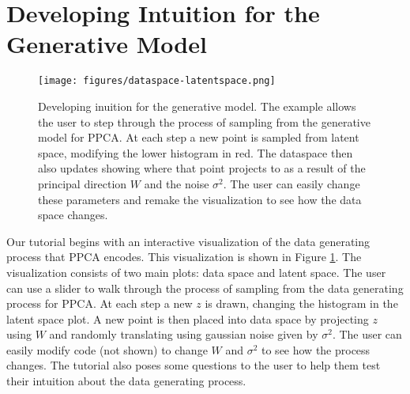 \section{Developing Intuition for the Generative Model}
\begin{figure}[h]
    \centering
    \texttt{[image: figures/dataspace-latentspace.png]}
    \caption{Developing inuition for the generative model. The example allows the user to step through the process of sampling from the generative model for PPCA. At each step a new point is sampled from latent space, modifying the lower histogram in red. The dataspace then also updates showing where that point projects to as a result of the principal direction $W$ and the noise $\sigma^2$. The user can easily change these parameters and remake the visualization to see how the data space changes.}
    \label{fig:dataspace-latentspace}
\end{figure}
Our tutorial begins with an interactive visualization of the data generating process that PPCA encodes. This visualization is shown in Figure \ref{fig:dataspace-latentspace}. The visualization consists of two main plots: data space and latent space. The user can use a slider to walk through the process of sampling from the data generating process for PPCA. At each step a new $z$ is drawn, changing the histogram in the latent space plot. A new point is then placed into data space by projecting $z$ using $W$ and randomly translating using gaussian noise given by $\sigma^2$. The user can easily modify code (not shown) to change $W$ and $\sigma^2$ to see how the process changes. The tutorial also poses some questions to the user to help them test their intuition about the data generating process. 
